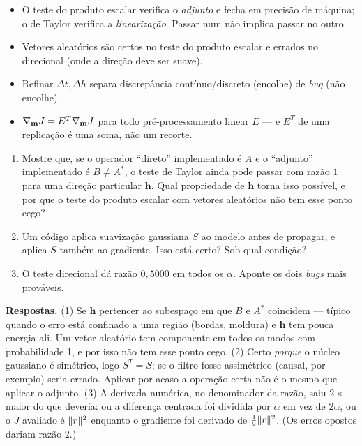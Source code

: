 \documentclass[11pt,a4paper,oneside]{report}
\begin{document}
\begin{resumo}
\begin{itemize}[leftmargin=*, itemsep=1pt]
\item O teste do produto escalar verifica o \emph{adjunto} e fecha em
precis\~ao de m\'aquina; o de Taylor verifica a \emph{lineariza\c{c}\~ao}.
Passar num n\~ao implica passar no outro.
\item Vetores aleat\'orios s\~ao certos no teste do produto escalar e errados
no direcional (onde a dire\c{c}\~ao deve ser suave).
\item Refinar $\Delta t,\Delta h$ separa discrep\^ancia cont\'inuo/discreto
(encolhe) de \emph{bug} (n\~ao encolhe).
\item $\nabla_{\mathbf{m}}J = E^{T}\nabla_{\tilde{\mathbf{m}}}J$ para todo
pr\'e-processamento linear $E$ --- e $E^{T}$ de uma replica\c{c}\~ao \'e uma
soma, n\~ao um recorte.
\end{itemize}
\end{resumo}

\begin{exercicio}[Problemas]
\begin{enumerate}[leftmargin=*, itemsep=2pt]
\item Mostre que, se o operador ``direto'' implementado \'e $A$ e o
``adjunto'' implementado \'e $B \ne A^{*}$, o teste de Taylor ainda pode
passar com raz\~ao $1$ para uma dire\c{c}\~ao particular $\mathbf{h}$. Qual
propriedade de $\mathbf{h}$ torna isso poss\'ivel, e por que o teste do
produto escalar com vetores aleat\'orios n\~ao tem esse ponto cego?
\item Um c\'odigo aplica suaviza\c{c}\~ao gaussiana $S$ ao modelo antes de
propagar, e aplica $S$ tamb\'em ao gradiente. Isso est\'a certo? Sob qual
condi\c{c}\~ao?
\item O teste direcional d\'a raz\~ao $0{,}5000$ em todos os $\alpha$. Aponte
os dois \emph{bugs} mais prov\'aveis.
\end{enumerate}
\textbf{Respostas.} (1) Se $\mathbf{h}$ pertencer ao subespa\c{c}o em que
$B$ e $A^{*}$ coincidem --- t\'ipico quando o erro est\'a confinado a uma
regi\~ao (bordas, moldura) e $\mathbf{h}$ tem pouca energia ali. Um vetor
aleat\'orio tem componente em todos os modos com probabilidade 1, e por isso
n\~ao tem esse ponto cego. (2) Certo \emph{porque} o n\'ucleo gaussiano \'e
sim\'etrico, logo $S^{T} = S$; se o filtro fosse assim\'etrico (causal, por
exemplo) seria errado. Aplicar por acaso a opera\c{c}\~ao certa n\~ao \'e o
mesmo que aplicar o adjunto. (3) A derivada num\'erica, no denominador da
raz\~ao, saiu $2\times$ maior do que deveria: ou a diferen\c{c}a centrada foi dividida por $\alpha$ em vez de
$2\alpha$, ou o $J$ avaliado \'e $\lVert r \rVert^{2}$ enquanto o gradiente foi
derivado de $\tfrac12\lVert r \rVert^{2}$. (Os erros opostos dariam raz\~ao $2$.)
\end{exercicio}
\end{document}

